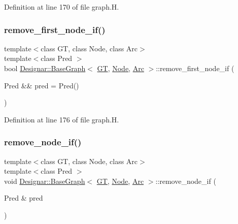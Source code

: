 Definition at line 170 of file graph.\+H.

\mbox{\label{class_designar_1_1_base_graph_aec049416b5240910cb04b1d6f55fcecf}} 
\subsubsection{\texorpdfstring{remove\+\_\+first\+\_\+node\+\_\+if()}{remove\_first\_node\_if()}\hspace{0.1cm}{\footnotesize\ttfamily [2/2]}}
{\footnotesize\ttfamily template$<$class GT, class Node, class Arc$>$ \\
template$<$class Pred $>$ \\
bool \hyperlink{class_designar_1_1_base_graph}{Designar\+::\+Base\+Graph}$<$ \hyperlink{demo-buildgraph_8_c_a3001c40d2c31ca87ed96cd7d1334a55e}{GT}, \hyperlink{namespace_designar_a5af326c65aa2bd26b26c410f2030d09e}{Node}, \hyperlink{namespace_designar_a3f55fb5513d62ff47cbc8f72b8e95d6f}{Arc} $>$\+::remove\+\_\+first\+\_\+node\+\_\+if (\begin{DoxyParamCaption}\item[{Pred \&\&}]{pred = {\ttfamily Pred()} }\end{DoxyParamCaption})\hspace{0.3cm}{\ttfamily [inline]}}



Definition at line 176 of file graph.\+H.

\mbox{\label{class_designar_1_1_base_graph_aae56ca6b3b936835d07275f2ceb4b0d1}} 
\subsubsection{\texorpdfstring{remove\+\_\+node\+\_\+if()}{remove\_node\_if()}\hspace{0.1cm}{\footnotesize\ttfamily [1/2]}}
{\footnotesize\ttfamily template$<$class GT, class Node, class Arc$>$ \\
template$<$class Pred $>$ \\
void \hyperlink{class_designar_1_1_base_graph}{Designar\+::\+Base\+Graph}$<$ \hyperlink{demo-buildgraph_8_c_a3001c40d2c31ca87ed96cd7d1334a55e}{GT}, \hyperlink{namespace_designar_a5af326c65aa2bd26b26c410f2030d09e}{Node}, \hyperlink{namespace_designar_a3f55fb5513d62ff47cbc8f72b8e95d6f}{Arc} $>$\+::remove\+\_\+node\+\_\+if (\begin{DoxyParamCaption}\item[{Pred \&}]{pred }\end{DoxyParamCaption})\hspace{0.3cm}{\ttfamily [inline]}}



